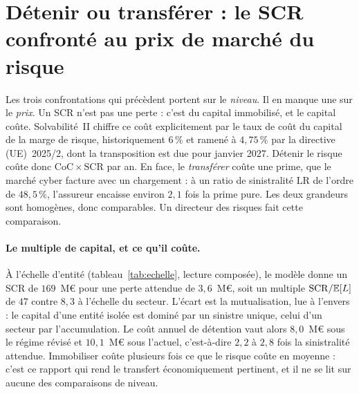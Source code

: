 
\section{Détenir ou transférer : le SCR confronté au prix de marché du risque}
\label{sec:detenir-transferer}

Les trois confrontations qui précèdent portent sur le \emph{niveau}. Il en manque une sur le
\emph{prix}. Un SCR n'est pas une perte : c'est du capital immobilisé, et le capital coûte.
Solvabilité~II chiffre ce coût explicitement par le taux de coût du capital de la marge de
risque, historiquement $6\,\%$ et ramené à $4{,}75\,\%$ par la directive
(UE)~2025/2, dont la transposition est due pour janvier 2027. Détenir le risque coûte donc
$\mathrm{CoC}\times\mathrm{SCR}$ par an. En face, le \emph{transférer} coûte une prime, que le
marché cyber facture avec un chargement : à un ratio de sinistralité $\mathrm{LR}$ de l'ordre de
$48{,}5\,\%$, l'assureur encaisse environ $2{,}1$ fois la prime pure. Les deux grandeurs sont
homogènes, donc comparables. Un directeur des risques fait cette comparaison.

\paragraph{Le multiple de capital, et ce qu'il coûte.} À l'échelle d'entité
(tableau~\ref{tab:echelle}, lecture composée), le modèle donne un SCR de $169$~M\euro{} pour une
perte attendue de $3{,}6$~M\euro, soit un multiple $\mathrm{SCR}/\mathbb{E}[L]$ de $47$ contre $8{,}3$
à l'échelle du secteur. L'écart est la mutualisation, lue à l'envers : le capital d'une entité
isolée est dominé par un sinistre unique, celui d'un secteur par l'accumulation. Le coût annuel
de détention vaut alors $8{,}0$~M\euro{} sous le régime révisé et $10{,}1$~M\euro{} sous
l'actuel, c'est-à-dire $2{,}2$ à $2{,}8$ fois la sinistralité attendue. Immobiliser
coûte plusieurs fois ce que le risque coûte en moyenne : c'est ce rapport qui rend le transfert
économiquement pertinent, et il ne se lit sur aucune des comparaisons de niveau.

